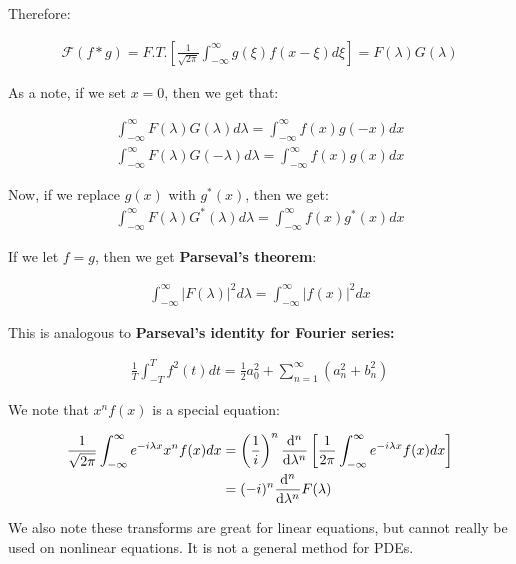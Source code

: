 \documentclass{article}
\theoremstyle{definition}
\def\F{\mathcal{F}}
\begin{document}
Therefore:

\begin{align*}
\F (f * g) = F.T. \left[\frac{1}{\sqrt{2 \pi}} \int_{-\infty}^{\infty} g(\xi) f(x-\xi) d\xi\right] = F(\lambda ) G(\lambda)
\end{align*}

As a note, if we set $x=0$, then we get that:

\begin{align*}
 \int_{-\infty}^{\infty} F(\lambda) G(\lambda) d\lambda =  \int_{-\infty}^{\infty} f(x) g(-x)dx \\
  \int_{-\infty}^{\infty} F(\lambda) G(-\lambda) d\lambda =  \int_{-\infty}^{\infty} f(x) g(x)dx 
\end{align*}

Now, if we replace $g(x)$ with $g^* (x)$, then we get:
\begin{align*}
 \int_{-\infty}^{\infty} F(\lambda) G^*(\lambda) d\lambda =  \int_{-\infty}^{\infty} f(x) g^*(x)dx 
\end{align*}

If we let $f = g$, then we get \textbf{Parseval's theorem}:

\begin{align*}
 \int_{-\infty}^{\infty} |F(\lambda)|^2 d\lambda =  \int_{-\infty}^{\infty} |f(x)|^2dx 
\end{align*}

This is analogous to \textbf{Parseval's identity for Fourier series:}

\begin{align*}
\frac{1}{T} \int_{-T}^{T} f^2(t) dt = \frac{1}{2} a_0^2  + \sum_{n=1}^\infty (a_n^2 + b_n^2)
\end{align*}


We note that $x^n f(x)$ is a special equation:

\begin{align*}
\frac{1}{\sqrt{2 \pi}} \int_{-\infty}^{\infty} e^{- i \lambda x} x^n f(x) dx &= 
\left(\frac{1}{i}\right)^n \dv{^n}{\lambda^n} \left[\frac{1}{2\pi} \int_{-\infty}^{\infty} e^{- i \lambda x} f(x) dx\right] \\ 
& = (-i)^n \dv{^n}{\lambda^n} F(\lambda)
\end{align*}

We also note these transforms are great for linear equations, but cannot really be used on nonlinear equations. It is not a general method for PDEs.
\end{document}
